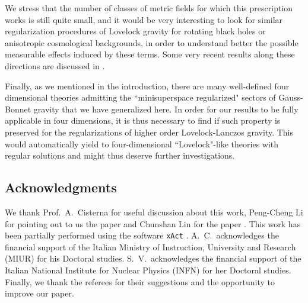 \documentclass[aps,prd,preprint,nofootinbib]{revtex4-1}
\begin{document}
We stress that the number of classes of metric fields for which this prescription works is still quite small, and it would be very interesting to look for similar regularization procedures of Lovelock gravity for rotating black holes or anisotropic cosmological backgrounds, in order to understand better the possible measurable effects induced by these terms. Some very recent results along these directions are discussed in \cite{DALLG}.

Finally, as we mentioned in the introduction, there are many well-defined four dimensional theories admitting the ``minisuperspace regularized" sectors of Gauss-Bonnet gravity that we have generalized here. In order for our results to be fully applicable in four dimensions, it is thus necessary to find if such property is preserved for the regularizations of higher order Lovelock-Lanczos gravity. This would automatically yield to four-dimensional ``Lovelock"-like theories with regular solutions and might thus deserve further investigations.

\subsection*{Acknowledgments}

We thank Prof.\ A.\ Cisterna for useful discussion about this work, Peng-Cheng Li for pointing out to us the paper \cite{conformal} and Chunshan Lin for the paper \cite{GRD=2}. This work has been partially performed using the software \texttt{xAct} \cite{xAct}. A.\ C.\ acknowledges the financial support of the Italian Ministry of Instruction, University and Research (MIUR) for his Doctoral studies. S.\ V.\ acknowledges the financial support of the Italian National Institute for Nuclear Physics (INFN) for her Doctoral studies. Finally, we thank the referees for their suggestions and the opportunity to improve our paper.
\end{document}
